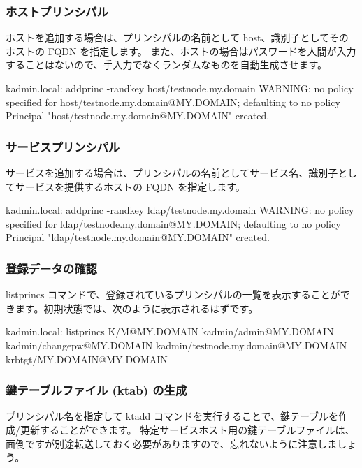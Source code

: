 \documentclass[mingoth,a4paper]{jsarticle}
\begin{document}
\subsubsection{ホストプリンシパル}

ホストを追加する場合は、プリンシパルの名前として host、識別子としてそのホストの FQDN を指定します。
また、ホストの場合はパスワードを人間が入力することはないので、手入力でなくランダムなものを自動生成させます。

\begin{commandline}
kadmin.local:  addprinc -randkey host/testnode.my.domain
WARNING: no policy specified for host/testnode.my.domain@MY.DOMAIN; defaulting to no policy
Principal "host/testnode.my.domain@MY.DOMAIN" created.
\end{commandline}

\subsubsection{サービスプリンシパル}

サービスを追加する場合は、プリンシパルの名前としてサービス名、識別子としてサービスを提供するホストの FQDN を指定します。

\begin{commandline}
kadmin.local:  addprinc -randkey ldap/testnode.my.domain
WARNING: no policy specified for ldap/testnode.my.domain@MY.DOMAIN; defaulting to no policy
Principal "ldap/testnode.my.domain@MY.DOMAIN" created.
\end{commandline}

\subsubsection{登録データの確認}

listprincs コマンドで、登録されているプリンシパルの一覧を表示することができます。初期状態では、次のように表示されるはずです。

\begin{commandline}
kadmin.local:  listprincs
K/M@MY.DOMAIN
kadmin/admin@MY.DOMAIN
kadmin/changepw@MY.DOMAIN
kadmin/testnode.my.domain@MY.DOMAIN
krbtgt/MY.DOMAIN@MY.DOMAIN
\end{commandline}

\subsubsection{鍵テーブルファイル (ktab) の生成}

プリンシパル名を指定して ktadd コマンドを実行することで、鍵テーブルを作成/更新することができます。
特定サービスホスト用の鍵テーブルファイルは、面倒ですが別途転送しておく必要がありますので、忘れないように注意しましょう。
\end{document}

